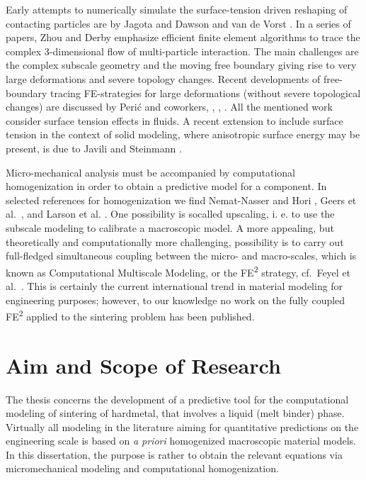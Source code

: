 \documentclass[MikaelDissertation.tex]{subfiles}
\begin{document}
Early attempts to numerically simulate the surface-tension driven reshaping of contacting particles are by Jagota and Dawson \cite{jagota_micromechanical_1988,jagota_micromechanical_1988-1} and van de Vorst \cite{van_de_vorst_integral_1993}.
In a series of papers, Zhou and Derby \cite{zhou_three-dimensional_1998,zhou_assessment_2001} emphasize efficient finite element algorithms to trace the complex 3-dimensional flow of multi-particle interaction.
The main challenges  are the complex subscale geometry and the moving free boundary giving rise to very large deformations and severe topology changes.
Recent developments of free-boundary tracing FE-strategies for large deformations (without severe topological changes) are discussed by Peri\'c and coworkers, \cite{dettmer_computational_2006}, \cite{saksono_finite_2006}, \cite{saksono_finite_2006-1}.
All the mentioned work consider surface tension effects in fluids.
A recent extension to include surface tension in the context of solid modeling, where anisotropic surface energy may be present, is due to Javili and Steinmann \cite{javili_finite_2010}.

Micro-mechanical analysis must be accompanied by computational homogenization in order to obtain a predictive model for a component.
In selected references for homogenization we find Nemat-Nasser and Hori \cite{nemat-nasser_micromechanics:_1993}, Geers et al.\ \cite{geers_multi-scale_2010}, and Larson et al. \cite{larsson_variationally_2010}.
One possibility is socalled upscaling, i. e. to use the subscale modeling to calibrate a macroscopic model.
A more appealing, but theoretically and computationally more challenging, possibility is to carry out full-fledged simultaneous coupling between the micro- and macro-scales, which is known as Computational Multiscale Modeling, or the FE\textsuperscript{2} strategy, cf.\ Feyel et al.\ \cite{feyel_fe2_2000}.
This is certainly the current international trend in material modeling for engineering purposes; however, to our knowledge no work on the fully coupled FE\textsuperscript{2} applied to the sintering problem has been published.

\chapter{Aim and Scope of Research}

The thesis concerns the development of a predictive tool for the computational modeling of sintering of hardmetal, that involves a liquid (melt binder) phase.
Virtually all modeling in the literature aiming for quantitative predictions on the engineering scale is based on \emph{a priori} homogenized macroscopic material models.
In this dissertation, the purpose is rather to obtain the relevant equations via micromechanical modeling and computational homogenization.
\end{document}
